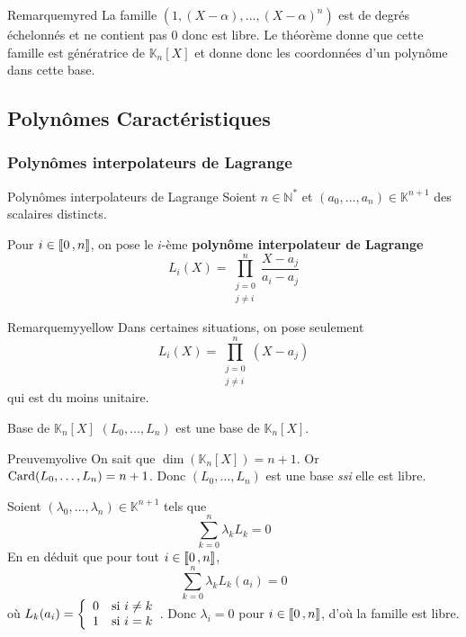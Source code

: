    \begin{omed}{Remarque}{myred}
        La famille $(1,(X-\alpha), \ldots, (X-\alpha)^n)$ est de degrés échelonnés et ne contient pas 0 donc est libre. Le théorème donne que cette famille est génératrice de $\mathbb{K}_n[X]$ et donne donc les coordonnées d’un polynôme dans cette base.
    \end{omed}

\subsection{Polynômes Caractéristiques}

    \subsubsection{Polynômes interpolateurs de Lagrange}

    \begin{defi}{Polynômes interpolateurs de Lagrange}{}
        Soient $n \in \mathbb{N}^*$ et $(a_0,\ldots,a_n) \in \mathbb{K}^{n+1}$ des scalaires distincts. 
        
        Pour $i \in \left\llbracket 0 \, , n \right\rrbracket$, on pose le $i$-ème \textbf{polynôme interpolateur de Lagrange}
        \[ L_i(X) = \prod_{\substack{j = 0 \\ j \neq i}}^{n} \frac{X - a_j}{a_i - a_j} \]
    \end{defi}

    \begin{omed}{Remarque}{myyellow}
        Dans certaines situations, on pose seulement 
        \[ L_i(X) = \prod_{\substack{j = 0 \\ j \neq i}}^{n} (X - a_j) \]
        qui est du moins unitaire.
    \end{omed}

    \begin{prop}{Base de $\mathbb{K}_n[X]$}{}
        $(L_0,\ldots, L_n)$ est une base de $\mathbb{K}_n[X]$.
    \end{prop}

    \begin{demo}{Preuve}{myolive}
        On sait que $\dim(\mathbb{K}_n[X]) = n+1$. Or $\operatorname{Card}(L_0,\ldots,L_n) = n+1$. Donc $(L_0,\ldots,L_n)$ est une base \textit{ssi} elle est libre.

        Soient $(\lambda_0,\ldots,\lambda_n) \in \mathbb{K}^{n+1}$ tels que 
        \[ \sum_{k=0}^{n} \lambda_k L_k = 0 \]  
        En en déduit que pour tout $i \in \left\llbracket 0 \, , n \right\rrbracket$, 
        \[ \sum_{k=0}^{n} \lambda_k L_k(a_i) = 0 \]   
        où $L_k(a_i) = \sisi{0}{i \neq k}{1}{i = k}$. Donc $\lambda_i = 0$ pour $i \in \left\llbracket 0 \, , n \right\rrbracket$, d’où la famille est libre.
    \end{demo}

